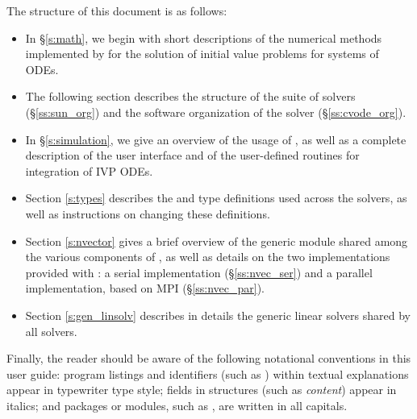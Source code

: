 The structure of this document is as follows:
\begin{itemize}
\item
  In \S\ref{s:math}, we begin with short descriptions of the numerical 
  methods implemented by {\cvode} for the solution of initial value problems
  for systems of ODEs.
\item
  The following section describes the structure of the {\sundials} suite
  of solvers (\S\ref{ss:sun_org}) and the software organization of the {\cvode}
  solver (\S\ref{ss:cvode_org}). 
\item
  In \S\ref{s:simulation}, we give an overview of the usage of {\cvode},
  as well as a complete description of the user interface and of the 
  user-defined routines for integration of IVP ODEs.
\item
  Section \ref{s:types} describes the  and  type definitions used 
  across the {\sundials} solvers, as well as instructions on changing these definitions.
\item
  Section \ref{s:nvector} gives a brief overview of the generic {\nvector} module 
  shared among the various components of {\sundials}, as well as details on the two {\nvector}
  implementations provided with {\sundials}: a serial implementation
  (\S\ref{ss:nvec_ser}) and a parallel implementation, based on MPI
  (\S\ref{ss:nvec_par}).
\item
  Section \ref{s:gen_linsolv} describes in details the generic linear solvers shared 
  by all {\sundials} solvers.
\end{itemize}

Finally, the reader should be aware of the following notational conventions
in this user guide:  program listings and identifiers (such as ) 
within textual explanations appear in typewriter type style; 
fields in {\C} structures (such as {\em content}) appear in italics;
and packages or modules, such as {\cvdense}, are written in all capitals. 